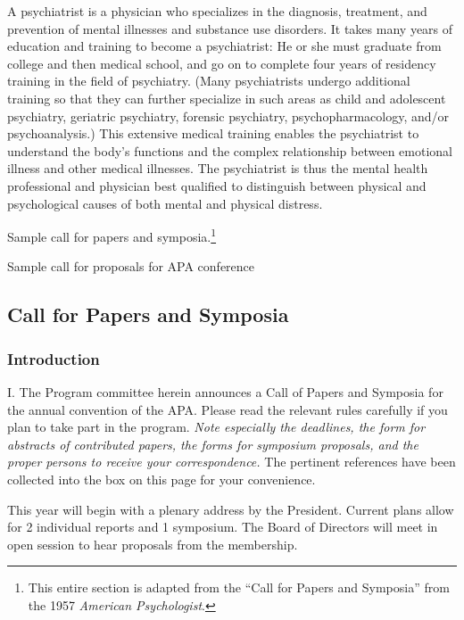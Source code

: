 \begin{refsection}
A psychiatrist is a physician who specializes in the diagnosis, treatment, and prevention of mental illnesses and substance use disorders. It takes many years of education and training to become a psychiatrist: He or she must graduate from college and then medical school, and go on to complete four years of residency training in the field of psychiatry. (Many psychiatrists undergo additional training so that they can further specialize in such areas as child and adolescent psychiatry, geriatric psychiatry, forensic psychiatry, psychopharmacology, and\slash or psychoanalysis.) This extensive medical training enables the psychiatrist to understand the body's functions and the complex relationship between emotional illness and other medical illnesses. The psychiatrist is thus the mental health professional and physician best qualified to distinguish between physical and psychological causes of both mental and physical distress.

Sample call for papers and symposia.\footnote{This entire section is adapted from the ``Call for Papers and Symposia'' from the 1957 \emph{American Psychologist}.}


\begin{apatextbox}{Sample call for proposals for APA conference}  

\subsection{Call for Papers and Symposia}
\label{callforpapersandsymposia}

\subsubsection{Introduction}
\label{introduction}

I. The Program committee herein announces a Call of Papers and Symposia for the annual convention of the APA. Please read the relevant rules carefully if you plan to take part in the program. \emph{Note especially the deadlines, the form for abstracts of contributed papers, the forms for symposium proposals, and the proper persons to receive your correspondence.} The pertinent references have been collected into the box on this page for your convenience.

This year will begin with a plenary address by the President. Current plans allow for 2 individual reports and 1 symposium. The Board of Directors will meet in open session to hear proposals from the membership.


\end{apatextbox}
\end{refsection}

